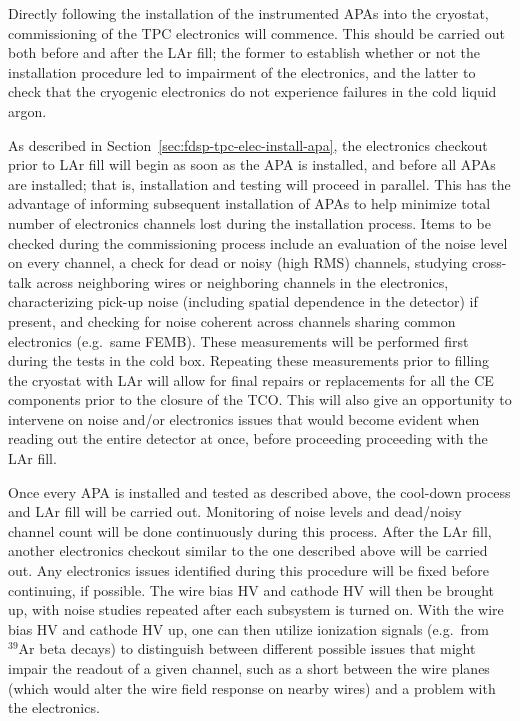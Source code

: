 Directly following the installation of the instrumented APAs into the cryostat, commissioning of the
TPC electronics will commence.  This should be carried out both before and after the LAr fill;
the former to establish whether or not the installation procedure led to impairment of the
electronics, and the latter to check that the cryogenic electronics do not experience failures
in the cold liquid argon.

As described in Section~\ref{sec:fdsp-tpc-elec-install-apa}, the electronics checkout prior to
LAr fill will begin as soon as the APA is installed, and before all APAs are installed; that is,
installation and testing will proceed in parallel.  This has the advantage of informing
subsequent installation of APAs to help minimize total number of electronics channels lost
during the installation process.  Items to be checked during the commissioning process include
an evaluation of the noise level on every channel, a check for dead or noisy (high RMS) channels,
studying cross-talk across neighboring wires or neighboring channels in the electronics,
characterizing pick-up noise (including spatial dependence in the detector) if present, and
checking for noise coherent across channels sharing common electronics (e.g.~same FEMB).
These measurements will be performed first during the tests in the cold box.  Repeating these
measurements prior to filling the cryostat with LAr will allow for final repairs or replacements
for all the CE components prior to the closure of the TCO. This will also give an opportunity
to intervene on noise and/or electronics issues that would become evident when reading out
the entire detector at once, before proceeding proceeding with the LAr fill.

Once every APA is installed and tested as described above, the cool-down process and LAr fill
will be carried out.  Monitoring of noise levels and dead/noisy channel count will be
done continuously during this process.  After the LAr fill, another electronics checkout
similar to the one described above will be carried out.  Any electronics issues identified
during this procedure will be fixed before continuing, if possible.  The wire bias HV and
cathode HV will then be brought up, with noise studies repeated after each subsystem is
turned on.  With the wire bias HV and cathode HV up, one can then utilize ionization signals
(e.g.~from $\mathrm{{}^{39}Ar}$ beta decays) to distinguish between different possible issues
that might impair the readout of a given channel, such as a short between the wire planes
(which would alter the wire field response on nearby wires) and a problem with the electronics.

